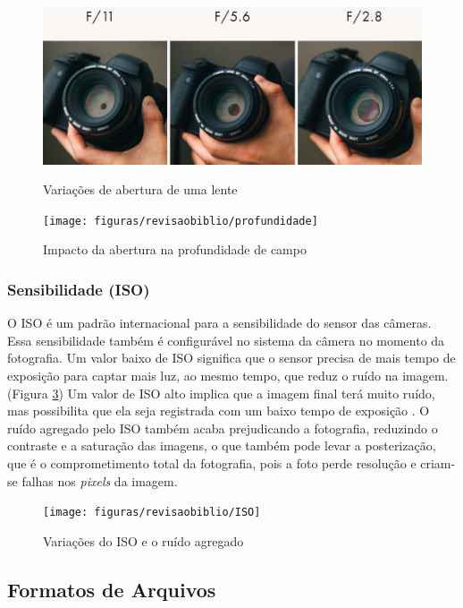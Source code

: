 \begin{figure}[!htb]
	\centering
	\caption{Variações de abertura de uma lente}
	\includegraphics[width=0.7\linewidth]{figuras/revisaobiblio/abertura}
	\label{fig:abertura}
\end{figure}

\begin{figure}[h]
	\centering
	\caption{Impacto da abertura na profundidade de campo}
	\texttt{[image: figuras/revisaobiblio/profundidade]}
	\label{fig:profundidade}
\end{figure}

\subsubsection{Sensibilidade (ISO)}

O ISO é um padrão internacional para a sensibilidade do sensor das câmeras. Essa sensibilidade também é configurável no sistema da câmera no momento da fotografia. Um valor baixo de ISO significa que o sensor precisa de mais tempo de exposição para captar mais luz, ao mesmo tempo, que reduz o ruído na imagem. (Figura \ref{fig:iso})
Um valor de ISO alto implica que a imagem final terá muito ruído, mas possibilita que ela seja registrada com um baixo tempo de exposição \cite{book:bbcsky}. O ruído agregado pelo ISO também acaba prejudicando a fotografia, reduzindo o contraste e a saturação das imagens, o que também pode levar a posterização, que é o comprometimento total da fotografia, pois a foto perde resolução e criam-se falhas nos \textit{pixels} da imagem.


\begin{figure}[!htb]
	\centering
	\caption{Variações do ISO e o ruído agregado}
	\texttt{[image: figuras/revisaobiblio/ISO]}
	\label{fig:iso}
\end{figure}

\subsection{Formatos de Arquivos}

